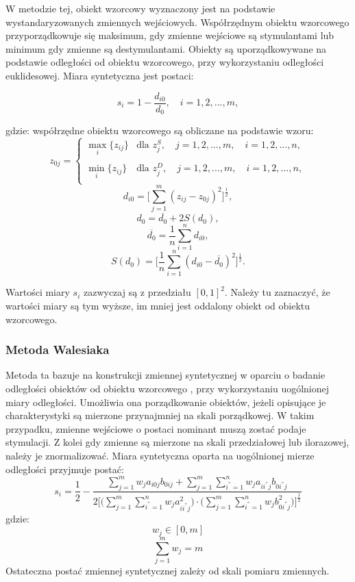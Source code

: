 \documentclass[12pt,a4paper]{report}
\begin{document}
W metodzie tej, obiekt wzorcowy wyznaczony jest na podstawie wystandaryzowanych zmiennych wejściowych. Współrzędnym obiektu wzorcowego przyporządkowuje się maksimum, gdy zmienne wejściowe są stymulantami lub minimum gdy zmienne są destymulantami. Obiekty są uporządkowywane na podstawie odległości od obiektu wzorcowego, przy wykorzystaniu odległości euklidesowej.
Miara syntetyczna jest postaci: 
\begin{center}
$$s_i=1-\frac{d_{i0}}{d_{0}},\quad i=1, 2, ..., m ,$$
\end{center}
gdzie:
\newline
współrzędne obiektu wzorcowego są obliczane na podstawie wzoru:
$$z_{0j}=\left\{ \begin{array}{ll}
\max\limits_{i} \{z_{ij}\} & \textrm{dla  } z_{j}^S,\quad j=1,2,...,m, \quad i=1,2,...,n,\\\\
\min\limits_{i} \{z_{ij}\} & \textrm{dla } z_{j}^D, \quad j=1,2,...,m, \quad i=1,2,...,n,\\
\end{array} \right. $$
$$d_{i0}=\bigg[\sum_{j=1}^{m} (z_{ij} - z_{0j})^2 \bigg]^\frac{1}{2} ,$$ 
$$d_{0}=\overline{d_{0}} + 2S(d_{0}) ,$$
$$\overline{d_{0}}=\frac{1}{n}\sum_{i=1}^{n} d_{i0} ,$$
$$S(d_{0})=\bigg[\frac{1}{n}\sum_{i=1}^{n} (d_{i0}-\overline{d_{0}})^2 \bigg]^\frac{1}{2} .$$

Wartości miary $s_{i}$ zazwyczaj są z przedziału $[0, 1]^2$. Należy tu zaznaczyć, że wartości miary są tym wyższe, im mniej jest oddalony obiekt od obiektu wzorcowego. 

\subsubsection{Metoda Walesiaka}
\noindent


Metoda ta bazuje na konstrukcji zmiennej syntetycznej w oparciu o badanie odległości obiektów od obiektu wzorcowego , przy wykorzystaniu uogólnionej miary odległości. Umożliwia ona  porządkowanie obiektów, jeżeli opisujące je charakterystyki są mierzone przynajmniej na skali porządkowej. W takim przypadku, zmienne wejściowe o postaci nominant muszą zostać podaje stymulacji. Z kolei gdy zmienne są mierzone na skali przedziałowej lub ilorazowej, należy je znormalizować. 
Miara syntetyczna oparta na uogólnionej mierze odległości przyjmuje postać:
\begin{equation}
s_i=\frac{1}{2}-\frac{\sum_{j=1}^{m} w_{j}a_{i0j}b_{0ij} + \sum_{j=1}^{m}\sum_{i^{''}=1}^{n} w_{j}a_{ii^{''}j}b_{0i^{''}j}}{2\bigg[\bigg(\sum_{j=1}^{m}\sum_{i^{''}=1}^{n} w_{j}a^{2}_{ii^{''}j} \bigg)\cdot \bigg(\sum_{j=1}^{m}\sum_{i^{''}=1}^{n} w_{j}b^{2}_{0i^{''}j}\bigg) \bigg]^{\frac{1}{2} }}
\end{equation}
gdzie:
$$w_{j} \in [0, m]$$
$$\sum_{j=1}^{m} w_{j}=m$$
\newline
Ostateczna postać zmiennej syntetycznej zależy od skali pomiaru zmiennych. 
\end{document}
